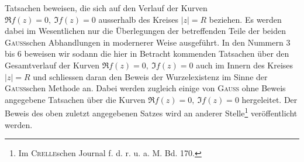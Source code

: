 Tatsachen beweisen, die sich auf den Verlauf der Kurven \(\Re f(z)=0,\ \Im f(z)=0\)
ausserhalb des Kreises \(|z|=R\) beziehen. Es werden dabei im Wesentlichen
nur die Überlegungen der betreffenden Teile der beiden \textsc{Gauss}schen Abhandlungen
in modernerer Weise ausgeführt. In den Nummern 3 bis 6 beweisen
wir sodann die hier in Betracht kommenden Tatsachen über den Gesamtverlauf
der Kurven \(\Re f(z)=0,\ \Im f(z)=0\) auch im Innern des Kreises \(|z|=R\)
und schliessen daran den Beweis der Wurzelexistenz im Sinne der \textsc{Gauss}schen
Methode an. Dabei werden zugleich einige von \textsc{Gauss} ohne Beweis angegebene
Tatsachen über die Kurven \(\Re f(z)=0,\ \Im f(z)=0\) hergeleitet. Der Beweis des
oben zuletzt angegebenen Satzes wird an anderer Stelle\footnote[1]{Im \textsc{Crelle}schen Journal f. d. r. u. a. M. Bd. 170.} veröffentlicht werden.
\par
